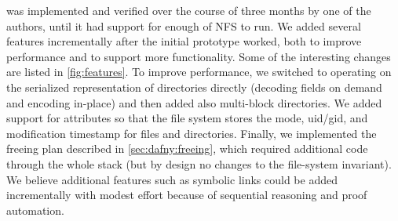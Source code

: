 \sys was implemented and verified over the course of three months by
one of the authors, until it had support for enough of NFS to run. We
added several features incrementally after the initial prototype
worked, both to improve performance and to support more
functionality. Some of the interesting changes are listed in
\autoref{fig:features}.  To improve performance, we switched to
operating on the serialized representation of directories directly
(decoding fields on demand and encoding in-place) and then added also
multi-block directories.  We added support for attributes so that the file
system stores the mode, uid/gid, and modification timestamp for files and directories.
Finally, we implemented the freeing plan described
in \autoref{sec:dafny:freeing}, which required additional code through the
whole stack (but by design no changes to the file-system invariant).
We believe additional features such as symbolic links
could be added incrementally with modest effort because
of sequential reasoning and proof automation.

